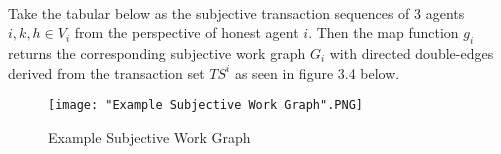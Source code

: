 \begin{example}[]\ \\
\label{ex:Example Transaction Reports and Subjective Work Graphs}
\noindent{}Take the tabular below as the subjective transaction sequences of 3 agents $i,k,h\in{}V_i$ from the perspective of honest agent $i$. Then the map function $g_i$ returns the corresponding subjective work graph $G_i$ with directed double-edges derived from the transaction set $TS^i$ as seen in figure 3.4 below. \vspace{1em}\\

\begin{comment}


\begin{minipage}{\textwidth}
\centering
\begin{minipage}{0.45\textwidth}
\begin{figure}[H]
\begin{tabular}{ l | c | r }
$i$ & $k$ & $h$ \\
\hline
$(i,k,3)$ & $(i,k,3)$ & $(h,i,4)$ \\
$(h,i,4)$ & $(h,k,2)$ & $(h,k,2)$ \\
$(i,k,4)$ & $(h,k,3)$ & $(k,h,3)$ \\
\end{tabular}
\end{figure}
\end{minipage}


\end{comment}

\begin{figure}[H]
\texttt{[image: "Example Subjective Work Graph".PNG]}
\label{fig:Example Subjective Work Graph}
\caption{Example Subjective Work Graph}
\end{figure}
\end{example}


